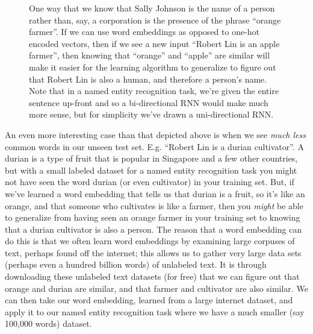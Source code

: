 \documentclass[12pt]{article}
\begin{document}
\begin{figure}[h]
  \centering
  \caption{\footnotesize One way that we know that Sally Johnson is the name of a person rather than, say, a corporation is the presence of the phrase ``orange farmer''. If we can use word embeddings as opposed to one-hot encoded vectors, then if we see a new input ``Robert Lin is an apple farmer'', then knowing that ``orange'' and ``apple'' are similar will make it easier for the learning algorithm to generalize to figure out that Robert Lin is also a human, and therefore a person's name. Note that in a named entity recognition task, we're given the entire sentence up-front and so a bi-directional RNN would make much more sense, but for simplicity we've drawn a uni-directional RNN.}
\end{figure}
An even more interesting case than that depicted above is when we see \emph{much less} common words in our unseen test set. E.g. ``Robert Lin is a durian cultivator''. A durian is a type of fruit that is popular in Singapore and a few other countries, but with a small labeled dataset for a named entity recognition task you might not have seen the word durian (or even cultivator) in your training set. But, if we've learned a word embedding that tells us that durian is a fruit, so it's like an orange, and that someone who cultivates is like a farmer, then you \emph{might} be able to generalize from having seen an orange farmer in your training set to knowing that a durian cultivator is also a person. The reason that a word embedding can do this is that we often learn word embeddings by examining large corpuses of text, perhaps found off the internet; this allows us to gather very large data sets (perhaps even a hundred billion words) of unlabeled text. It is through downloading these unlabeled text datasets (for free) that we can figure out that orange and durian are similar, and that farmer and cultivator are also similar. We can then take our word embedding, learned from a large internet dataset, and apply it to our named entity recognition task where we have a much smaller (say 100,000 words) dataset.
\end{document}
